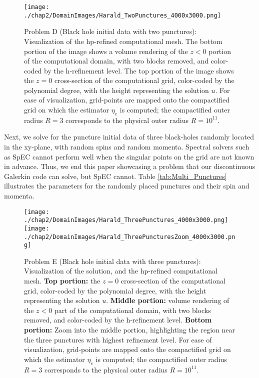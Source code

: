 \begin{figure}[ht!]
  \centering
\texttt{[image: ./chap2/DomainImages/Harald\_TwoPunctures\_4000x3000.png]}
  \caption{Problem D (Black hole initial data with two punctures):
    Visualization of the hp-refined computational mesh.  The bottom
    portion of the image shows a volume rendering of the $z<0$ portion
    of the computational domain, with two blocks removed, and
    color-coded by the h-refinement level.  The top portion of the
    image shows the $z=0$ cross-section of the computational grid, color-coded by the polynomial degree, with the height representing the solution $u$. For ease of visualization, grid-points are mapped onto the compactified grid on which the estimator $\eta_e$ is computed; the compactified outer radius $R=3$ corresponds to the physical outer radius $R=10^{11}$.}
  \label{fig:Two_Punctures_Mesh_Final}
\end{figure}



Next, we solve for the puncture initial data of three black-holes
randomly located in the xy-plane, with random spins and random
momenta. Spectral solvers such as SpEC cannot perform well when the
singular points on the grid are not known in advance. Thus, we end
this paper showcasing a problem that our discontinuous Galerkin code
can solve, but SpEC cannot. Table \ref{tab:Multi_Punctures}
illustrates the parameters for the randomly placed punctures and their
spin and momenta.


\begin{figure}[H]
  \centering
  \texttt{[image: ./chap2/DomainImages/Harald\_ThreePunctures\_4000x3000.png]}
  \\
\texttt{[image: ./chap2/DomainImages/Harald\_ThreePuncturesZoom\_4000x3000.png]}

  \caption{Problem E (Black hole initial data with three punctures):
    Visualization of the solution, and the hp-refined computational
    mesh.  {\bf Top portion:} the $z=0$ cross-section of the
    computational grid, color-coded by the polynomial degree, with the
    height representing the solution $u$.  {\bf Middle portion:}
    volume rendering of the $z<0$ part of the computational domain,
    with two blocks removed, and color-coded by the
    h-refinement level.  {\bf Bottom portion:} Zoom into the middle
    portion, highlighting the region near the three punctures with
    highest refinement level. For ease of visualization, grid-points are mapped onto the compactified grid on which the estimator $\eta_e$ is computed; the compactified outer radius $R=3$ corresponds to the physical outer radius $R=10^{11}$. }
  \label{fig:Two_Punctures_Mesh_Final}
\end{figure}

